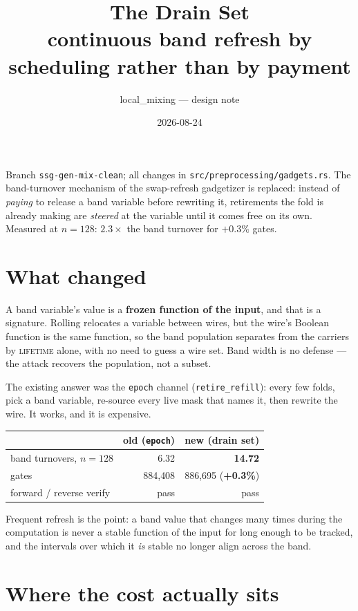\documentclass[11pt]{article}
\title{The Drain Set\\[2pt]\large continuous band refresh by scheduling rather than by payment}
\author{local\_mixing --- design note}
\date{2026-08-24}
\begin{document}
\maketitle

\noindent
Branch \texttt{ssg-gen-mix-clean}; all changes in
\texttt{src/preprocessing/gadgets.rs}. The band-turnover mechanism of the
swap-refresh gadgetizer is replaced: instead of \emph{paying} to release a
band variable before rewriting it, retirements the fold is already making are
\emph{steered} at the variable until it comes free on its own. Measured at
$n=128$: $2.3\times$ the band turnover for $+0.3\%$ gates.

\section{What changed}

A band variable's value is a \textbf{frozen function of the input}, and that is
a signature. Rolling relocates a variable between wires, but the wire's Boolean
function is the same function, so the band population separates from the
carriers by \textsc{lifetime} alone, with no need to guess a wire set. Band
width is no defense --- the attack recovers the population, not a subset.

The existing answer was the \texttt{epoch} channel
(\texttt{retire\_refill}): every few folds, pick a band variable, re-source
every live mask that names it, then rewrite the wire. It works, and it is
expensive.

\begin{center}
\begin{tabular}{lrr}
\toprule
 & old (\texttt{epoch}) & new (drain set) \\
\midrule
band turnovers, $n=128$ & 6.32 & \textbf{14.72} \\
gates & 884{,}408 & 886{,}695 \;(\textbf{+0.3\%}) \\
forward / reverse verify & pass & pass \\
\bottomrule
\end{tabular}
\end{center}

\noindent Frequent refresh is the point: a band value that changes many times
during the computation is never a stable function of the input for long enough
to be tracked, and the intervals over which it \emph{is} stable no longer align
across the band.

\section{Where the cost actually sits}
\end{document}
